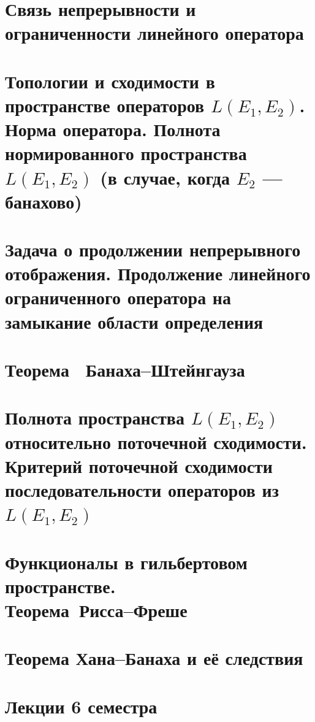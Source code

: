 \section{Связь непрерывности и ограниченности линейного оператора}


\section{Топологии и сходимости в пространстве операторов $L(E_1, E_2)$. Норма оператора. Полнота нормированного пространства $L(E_1, E_2)$ (в случае, когда $E_2$ --- банахово)}


\section{Задача о продолжении непрерывного отображения. Продолжение линейного ограниченного оператора на замыкание области определения}


\section{Теорема ~{Банаха--Штейнгауза}}


\section{Полнота пространства $L(E_1, E_2)$ относительно поточечной сходимости. Критерий поточечной сходимости последовательности операторов из $L(E_1, E_2)$}


\section{Функционалы в гильбертовом пространстве.\\Теорема~{Рисса--Фреше}}


\section{Теорема Хана--Банаха и её следствия}


\section{Лекции 6 семестра}















